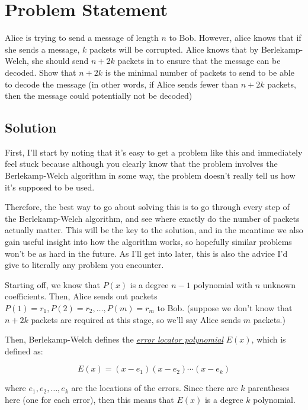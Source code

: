 \documentclass[10pt]{article}
\begin{document}
    \section*{Problem Statement}

    Alice is trying to send a message of length $n$ to Bob. However, alice knows that if she sends a message, $k$ packets will be corrupted. Alice knows that by Berlekamp-Welch, she should send $n + 2k$ packets in to ensure that the message can be decoded. Show that $n+2k$ is the minimal number of packets to send to be able to decode the message (in other words, if Alice sends fewer than $n+2k$ packets, then the message could potentially not be decoded)

    \subsection*{Solution}

    
    First, I'll start by noting that it's easy to get a problem like this and immediately feel stuck because although you clearly know that the problem involves the Berlekamp-Welch algorithm in some way, the problem doesn't really tell us how it's supposed to be used. 

    Therefore, the best way to go about solving this is to go through every step of the Berlekamp-Welch algorithm, and see where exactly do the number of packets actually matter. This will be the key to the solution, and in the meantime we also gain useful insight into how the algorithm works, so hopefully similar problems won't be as hard in the future. As I'll get into later, this is also the advice I'd give to literally any problem you encounter.
    
    Starting off, we know that $P(x)$ is a degree $n-1$ polynomial with $n$ unknown coefficients. Then, Alice sends out packets $P(1) = r_1, P(2) = r_2, \dots, P(m) = r_{m}$ to Bob. (suppose we don't know that $n+2k$ packets are required at this stage, so we'll say Alice sends $m$ packets.)

    Then, Berlekamp-Welch defines the \underline{\textit{error locator polynomial}} $E(x)$, which is defined as:

    \[ E(x) = (x - e_1)(x - e_2) \cdots (x - e_k)\] 

    where $e_1, e_2, \dots, e_k$ are the locations of the errors. Since there are $k$ parentheses here (one for each error), then this means that $E(x)$ is a degree $k$ polynomial. 
    
\end{document}
